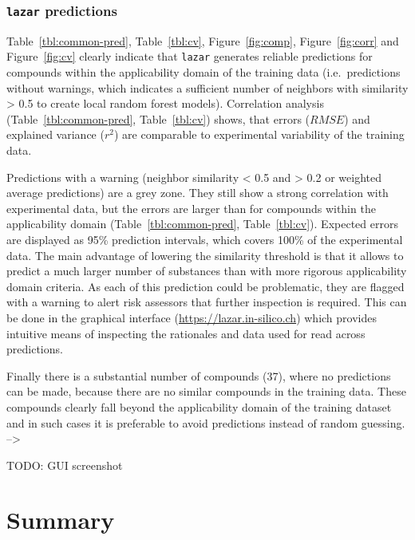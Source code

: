 \documentclass[]{achemso}
\begin{document}
\subsubsection{\texorpdfstring{\texttt{lazar}
predictions}{lazar predictions}}\label{lazar-predictions}

Table~\ref{tbl:common-pred}, Table~\ref{tbl:cv}, Figure~\ref{fig:comp},
Figure~\ref{fig:corr} and Figure~\ref{fig:cv} clearly indicate that
\texttt{lazar} generates reliable predictions for compounds within the
applicability domain of the training data (i.e.~predictions without
warnings, which indicates a sufficient number of neighbors with
similarity \textgreater{} 0.5 to create local random forest models).
Correlation analysis (Table~\ref{tbl:common-pred}, Table~\ref{tbl:cv})
shows, that errors (\(RMSE\)) and explained variance (\(r^2\)) are
comparable to experimental variability of the training data.

Predictions with a warning (neighbor similarity \textless{} 0.5 and
\textgreater{} 0.2 or weighted average predictions) are a grey zone.
They still show a strong correlation with experimental data, but the
errors are larger than for compounds within the applicability domain
(Table~\ref{tbl:common-pred}, Table~\ref{tbl:cv}). Expected errors are
displayed as 95\% prediction intervals, which covers 100\% of the
experimental data. The main advantage of lowering the similarity
threshold is that it allows to predict a much larger number of
substances than with more rigorous applicability domain criteria. As
each of this prediction could be problematic, they are flagged with a
warning to alert risk assessors that further inspection is required.
This can be done in the graphical interface
(\url{https://lazar.in-silico.ch}) which provides intuitive means of
inspecting the rationales and data used for read across predictions.

Finally there is a substantial number of compounds (37), where no
predictions can be made, because there are no similar compounds in the
training data. These compounds clearly fall beyond the applicability
domain of the training dataset and in such cases it is preferable to
avoid predictions instead of random guessing. --\textgreater{}

TODO: GUI screenshot

\section{Summary}\label{summary}
\end{document}
